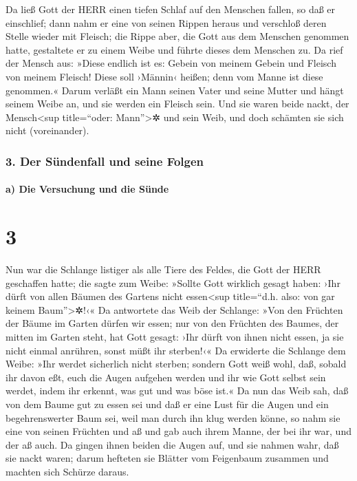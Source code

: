  Da ließ Gott der HERR einen tiefen Schlaf auf den
Menschen fallen, so daß er einschlief; dann nahm er eine von seinen
Rippen heraus und verschloß deren Stelle wieder mit Fleisch;
 die Rippe aber, die Gott aus dem Menschen genommen
hatte, gestaltete er zu einem Weibe und führte dieses dem Menschen zu.
 Da rief der Mensch aus: »Diese endlich ist es: Gebein
von meinem Gebein und Fleisch von meinem Fleisch! Diese soll ›Männin‹
heißen; denn vom Manne ist diese genommen.«  Darum
verläßt ein Mann seinen Vater und seine Mutter und hängt seinem Weibe
an, und sie werden ein Fleisch sein.  Und sie waren beide
nackt, der Mensch\textless sup title=``oder: Mann''\textgreater✲ und
sein Weib, und doch schämten sie sich nicht (voreinander).

\hypertarget{der-suxfcndenfall-und-seine-folgen}{%
\subsubsection{3. Der Sündenfall und seine
Folgen}\label{der-suxfcndenfall-und-seine-folgen}}

\hypertarget{a-die-versuchung-und-die-suxfcnde}{%
\paragraph{a) Die Versuchung und die
Sünde}\label{a-die-versuchung-und-die-suxfcnde}}

\hypertarget{section-2}{%
\section{3}\label{section-2}}

 Nun war die Schlange listiger als alle Tiere des Feldes,
die Gott der HERR geschaffen hatte; die sagte zum Weibe: »Sollte Gott
wirklich gesagt haben: ›Ihr dürft von allen Bäumen des Gartens nicht
essen\textless sup title=``d.h. also: von gar keinem
Baum''\textgreater✲!‹«  Da antwortete das Weib der
Schlange: »Von den Früchten der Bäume im Garten dürfen wir essen;
 nur von den Früchten des Baumes, der mitten im Garten
steht, hat Gott gesagt: ›Ihr dürft von ihnen nicht essen, ja sie nicht
einmal anrühren, sonst müßt ihr sterben!‹«  Da erwiderte
die Schlange dem Weibe: »Ihr werdet sicherlich nicht sterben;
 sondern Gott weiß wohl, daß, sobald ihr davon eßt, euch
die Augen aufgehen werden und ihr wie Gott selbst sein werdet, indem ihr
erkennt, was gut und was böse ist.«  Da nun das Weib sah,
daß von dem Baume gut zu essen sei und daß er eine Lust für die Augen
und ein begehrenswerter Baum sei, weil man durch ihn klug werden könne,
so nahm sie eine von seinen Früchten und aß und gab auch ihrem Manne,
der bei ihr war, und der aß auch.  Da gingen ihnen beiden
die Augen auf, und sie nahmen wahr, daß sie nackt waren; darum hefteten
sie Blätter vom Feigenbaum zusammen und machten sich Schürze daraus.

